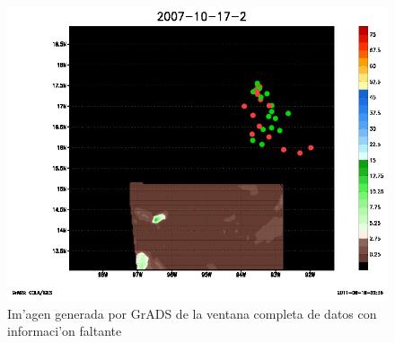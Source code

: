 \begin{figure}[h!]
 \centering
 \includegraphics[width=130mm]{./imagenes/2007_10_17_2.jpg}
 \caption{Im'agen generada por GrADS de la ventana completa de datos con informaci'on faltante}
\end{figure}
